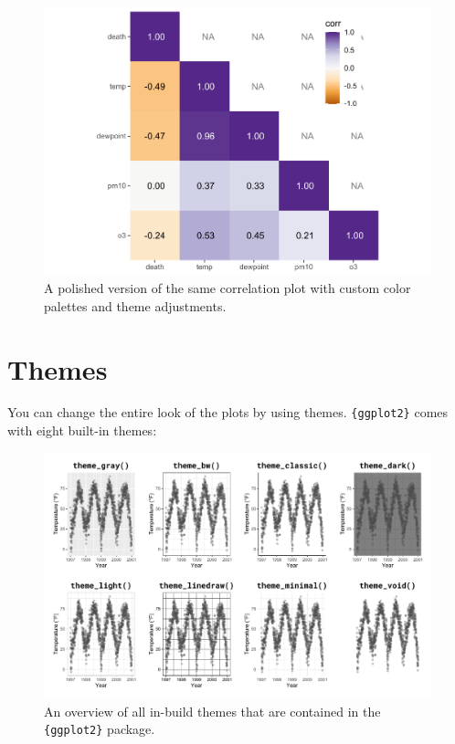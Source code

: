 \documentclass[
]{krantz}
\begin{document}
\begin{figure}
\centering
\includegraphics{bookdown_files/figure-latex/tile-corr-plot-polished-1.pdf}
\caption{\label{fig:tile-corr-plot-polished}A polished version of the same correlation plot with custom color palettes and theme adjustments.}
\end{figure}

\hypertarget{themes}{%
\chapter{Themes}\label{themes}}

You can change the entire look of the plots by using themes. \texttt{\{ggplot2\}} comes with eight built-in themes:

\begin{figure}
\centering
\includegraphics{bookdown_files/figure-latex/ggplot2-theme-gallery-1.pdf}
\caption{\label{fig:ggplot2-theme-gallery}An overview of all in-build themes that are contained in the \texttt{\{ggplot2\}} package.}
\end{figure}
\end{document}
